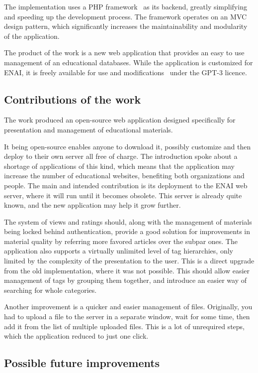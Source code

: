 \documentclass[
  digital,     %
  oneside,     %
  nosansbold,  %
  colorbold, %
  lof,         %
  lot,         %
]{fithesis4}
\begin{document}
The implementation uses a PHP framework~\cite{codeigniter4} as its backend, greatly simplifying and speeding up the development process. The framework operates on an MVC design pattern, which significantly increases the maintainability and modularity of the application.

The product of the work is a new web application that provides an easy to use management of an educational databases. While the application is customized for ENAI, it is freely available for use and modifications~\cite{repository} under the GPT-3 licence.

\subsection{Contributions of the work}

The work produced an open-source web application designed specifically for presentation and management of educational materials. 

It being open-source enables anyone to download it, possibly customize and then deploy to their own server all free of charge. The introduction spoke about a shortage of applications of this kind, which means that the application may increase the number of educational websites, benefiting both organizations and people. The main and intended contribution is its deployment to the ENAI web server, where it will run until it becomes obsolete. This server is already quite known, and the new application may help it grow further.

The system of views and ratings should, along with the management of materials being locked behind authentication, provide a good solution for improvements in material quality by referring more favored articles over the subpar ones. The application also supports a virtually unlimited level of tag hierarchies, only limited by the complexity of the presentation to the user. This is a direct upgrade from the old implementation, where it was not possible. This should allow easier management of tags by grouping them together, and introduce an easier way of searching for whole categories.

Another improvement is a quicker and easier management of files. Originally, you had to upload a file to the server in a separate window, wait for some time, then add it from the list of multiple uploaded files. This is a lot of unrequired steps, which the application reduced to just one click.

\subsection{Possible future improvements}
\end{document}
